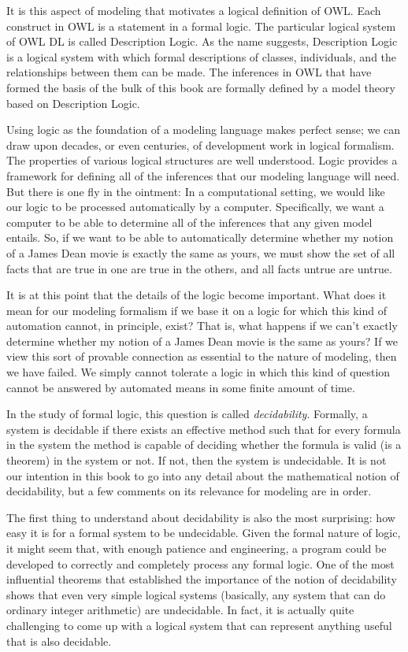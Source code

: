 It is this aspect of modeling that motivates a logical definition of
OWL. Each construct in OWL is a statement in a formal logic. The
particular logical system of OWL DL is called Description Logic. As the
name suggests, Description Logic is a logical system with which formal
descriptions of classes, individuals, and the relationships between them
can be made. The inferences in OWL that have formed the basis of the
bulk of this book are formally defined by a model theory based on
Description Logic.

Using logic as the foundation of a modeling language makes perfect
sense; we can draw upon decades, or even centuries, of development work
in logical formalism. The properties of various
logical structures are well understood. Logic provides a framework for
defining all of the inferences that our modeling language will need. But
there is one fly in the ointment: In a computational setting, we would
like our logic to be processed automatically by a computer.
Specifically, we want a computer to be able to determine all of the
inferences that any given model entails. So, if we want to be able to
automatically determine whether my notion of a James Dean movie is
exactly the same as yours, we must show the set of all facts that are
true in one are true in the others, and all facts untrue are untrue.

It is at this point that the details of the logic become important. What
does it mean for our modeling
formalism if we base it on a logic for which this kind of automation
cannot, in principle, exist? That is, what happens if we can't exactly
determine whether my notion of a James Dean movie is the same as yours?
If we view this sort of provable connection as essential to the nature
of modeling, then we have failed. We simply cannot tolerate a logic in
which this kind of question cannot be answered by automated means in
some finite amount of time.

In the study of formal logic, this question is called \emph{decidability}.
Formally, a system is decidable if there exists an effective method such
that for every formula in the system the method is capable of deciding
whether the formula is valid (is a theorem) in the system or not. If
not, then the system is undecidable. It is not our intention in this
book to go into any detail about the mathematical notion of
decidability, but a few comments on its relevance for modeling are in
order.

The first thing to understand about decidability is also the most
surprising: how easy it is for a formal system to be undecidable. Given
the formal nature of logic, it might seem that, with enough patience and
engineering, a program could be developed to correctly and completely
process any formal logic. One of the most influential theorems that
established the importance of the notion of decidability shows that even
very simple logical systems (basically, any system that can do ordinary
integer arithmetic) are undecidable. In fact, it is actually quite
challenging to come up with a logical system that can represent anything
useful that is also decidable.


